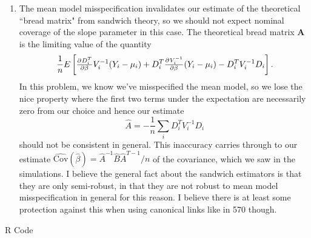 \documentclass[11pt]{article}
\newcommand{\Cov}{\mathrm{Cov}}
\begin{document}
\begin{enumerate}
\begin{enumerate}
		\item The mean model misspecification invalidates our estimate of the theoretical ``bread matrix" from sandwich theory, so we should not expect nominal coverage of the slope parameter in this case. The theoretical bread matrix $\bm{A}$ is the limiting value of the quantity
		\[
			\frac{1}{n}E\left[\pd{D_i^T}{\beta}V_i^{-1}(Y_i-\mu_i) + D_i^T \pd{V_i^{-1}}{\beta}(Y_i-\mu_i) - D_i^TV_i^{-1}D_i\right].
		\]
		In this problem, we know we've misspecified the mean model, so we lose the nice property where the first two terms under the expectation are necessarily zero from our choice and hence our estimate 
		\[
			\widehat{A} = -\frac{1}{n}\sum_i D_i^TV_i^{-1}D_i
		\]
		should not be consistent in general. This inaccuracy carries through to our estimate $\widehat{\Cov}(\widehat{\beta}) = \widehat{A}^{-1}\widehat{B}\widehat{A}^{T-1}/n$ of the covariance, which we saw in the simulations. I believe the general fact about the sandwich estimators is that they are only semi-robust, in that they are not robust to mean model misspecification in general for this reason. I believe there is at least some protection against this when using canonical links like in 570 though.
		\end{enumerate}
\end{enumerate}
\newpage
R Code
\end{document}
